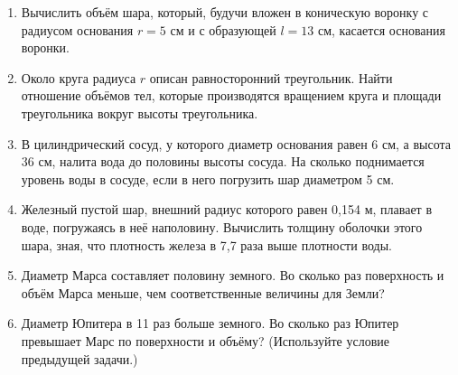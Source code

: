 \begin{enumerate}
\item
Вычислить объём шара, который, будучи вложен в коническую воронку с радиусом основания $r = 5$ см и с образующей $l = 13$ см, касается основания воронки.

\item
Около круга радиуса $r$ описан равносторонний треугольник.
Найти отношение объёмов тел, которые производятся вращением круга и площади треугольника вокруг высоты треугольника.

\item
В цилиндрический сосуд, у которого диаметр основания равен 6 см, а высота 36 см, налита вода до половины высоты сосуда.
На сколько поднимается уровень воды в сосуде, если в него погрузить шар диаметром 5 см.

\item
Железный пустой шар, внешний радиус которого равен 0,154 м, плавает в воде, погружаясь в неё наполовину.
Вычислить толщину оболочки этого шара, зная, что плотность железа в 7,7 раза выше плотности воды.

\item
Диаметр Марса составляет половину земного.
Во сколько раз поверхность и объём Марса меньше, чем соответственные величины для Земли?

\item
Диаметр Юпитера в 11 раз больше земного.
Во сколько раз Юпитер превышает Марс по поверхности и объёму? (Используйте условие предыдущей задачи.)
\end{enumerate}
